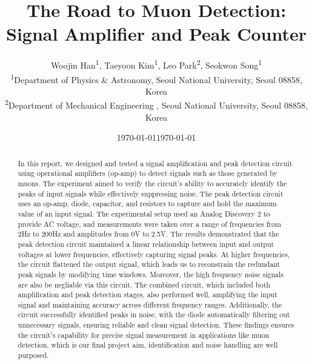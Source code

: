 \documentclass[%
 reprint,
 amsmath,amssymb,
 aps,
floatfix,
]{revtex4-2}
\begin{document}
\title{\textbf{The Road to Muon Detection: Signal Amplifier and Peak Counter}}
\author{
    Woojin Han\textsuperscript{1}, Taeyoon Kim\textsuperscript{1}, Leo Park\textsuperscript{2}, Seokwon Song\textsuperscript{1}  \\
  \textsuperscript{1}Department of Physics \& Astronomy, Seoul National University, Seoul 08858, Korea \\
  \textsuperscript{2}Department of Mechanical Engineering , Seoul National University, Seoul 08858, Korea \\
  \date{\today}
}

\date{\today}

\begin{abstract}
    In this report, we designed and tested a signal amplification and peak detection circuit using operational amplifiers (op-amp) to detect signals such as those generated by muons.
    The experiment aimed to verify the circuit's ability to accurately identify the peaks of input signals while effectively suppressing noise.
    The peak detection circuit uses an op-amp, diode, capacitor, and resistors to capture and hold the maximum value of an input signal.
    The experimental setup used an Analog Discovery 2 to provide AC voltage, and measurements were taken over a range of frequencies from 2Hz to 200Hz and amplitudes from 0V to 2.5V.
    The results demonstrated that the peak detection circuit maintained a linear relationship between input and output voltages at lower frequencies, effectively capturing signal peaks.
    At higher frequencies, the circuit flattened the output signal, which leads us to reconstrain the redundant peak signals by modifying time windows.
    Moreover, the high frequency noise signals are also be negliable via this circuit.
    The combined circuit, which included both amplification and peak detection stages, also performed well, amplifying the input signal and maintaining accuracy across different frequency ranges.
    Additionally, the circuit successfully identified peaks in noise, with the diode automatically filtering out unnecessary signals, ensuring reliable and clean signal detection.
    These findings ensures the circuit's capability for precise signal measurement in applications like muon detection, which is our final project aim, identification and noise handling are well purposed.
\end{abstract}
\maketitle
\end{document}
